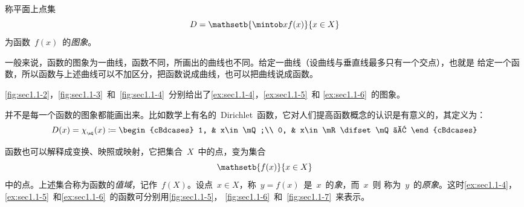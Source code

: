 \begin{definition}
称平面上点集
\[
  D=\mathsetb{\mintob x{f(x)}}{x\in X}
\]
为函数~$f(x)$~的\emph{图象}。
\end{definition}

一般来说，函数的图象为一曲线，函数不同，所画出的曲线也不同。给定一曲线（设曲线与垂直线最多只有一个交点），也就是
给定一个函数，所以函数与上述曲线可以不加区分，把函数说成曲线，也可以把曲线说成函数。

\ref{fig:sec1.1-2}，\ref{fig:sec1.1-3}~和~\ref{fig:sec1.1-4}~分别给出了\ref{ex:sec1.1-4}，\ref{ex:sec1.1-5}~和%
\ref{ex:sec1.1-6}~的图象。

\begin{figure}
\begin{floatrow}[3]
\figurebox{\caption{}\label{fig:sec1.1-2}}
          {\somefigure}
\figurebox{\caption{}\label{fig:sec1.1-3}}
          {\somefigure}
\figurebox{\caption{}\label{fig:sec1.1-4}}
          {\somefigure}
\end{floatrow}
\end{figure}

并不是每一个函数的图象都能画出来。比如数学上有名的~Dirichlet~函数，它对人们提高函数概念的认识是有意义的，其定义为：
\[
  D(x)=\chi_{_{\mQ}}(x)\coloneq\begin{cBdcases}
  1, & x\in\mQ;\\
  0, & x\in\mR\difset\mQ 。
  \end{cBdcases}
\]

函数也可以解释成变换、映照或映射，它把集合~$X$~中的点，变为集合
\[
  \mathsetb{f(x)}{x\in X}
\]
中的点。上述集合称为函数的\emph{值域}，记作~$f(X)$。设点~$x\in X$，称~$y=f(x)$~是~$x$~的\emph{象}，而~$x$~则
称为~$y$~的\emph{原象}。这时\ref{ex:sec1.1-4}，\ref{ex:sec1.1-5}~和\ref{ex:sec1.1-6}~的函数可分别用\ref{fig:sec1.1-5}，%
\ref{fig:sec1.1-6}~和~\ref{fig:sec1.1-7}~来表示。

\begin{figure}
\begin{floatrow}[3]
\figurebox{\caption{}\label{fig:sec1.1-5}}
          {\somefigure}
\figurebox{\caption{}\label{fig:sec1.1-6}}
          {\somefigure}
\figurebox{\caption{}\label{fig:sec1.1-7}}
          {\somefigure}
\end{floatrow}
\end{figure}

